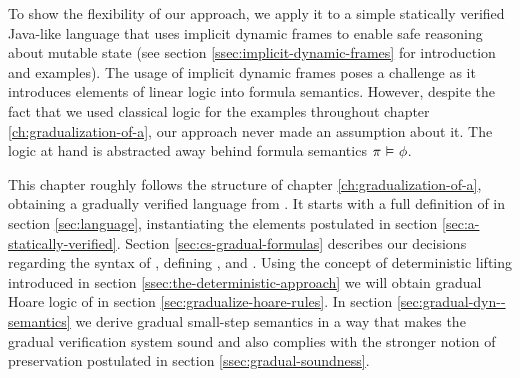 To show the flexibility of our approach, we apply it to a simple statically verified Java-like language \svlidf that uses implicit dynamic frames to enable safe reasoning about mutable state (see section \ref{ssec:implicit-dynamic-frames} for introduction and examples).
The usage of implicit dynamic frames poses a challenge as it introduces elements of linear logic into formula semantics.
However, despite the fact that we used classical logic for the examples throughout chapter \ref{ch:gradualization-of-a}, our approach never made an assumption about it.
The logic at hand is abstracted away behind formula semantics $\pi \,\,{\vDash}\,\, \phi$.

This chapter roughly follows the structure of chapter \ref{ch:gradualization-of-a}, obtaining a gradually verified language \gvlidf from \svlidf.
It starts with a full definition of \svlidf in section \ref{sec:language}, instantiating the elements postulated in section \ref{sec:a-statically-verified}.
Section \ref{sec:cs-gradual-formulas} describes our decisions regarding the syntax of \gvlidf, defining \setGFormula, \setGStmt and \setGProgramState.
Using the concept of deterministic lifting introduced in section \ref{ssec:the-deterministic-approach} we will obtain gradual Hoare logic of \gvlidf in section \ref{sec:gradualize-hoare-rules}.
In section \ref{sec:gradual-dyn--semantics} we derive gradual small-step semantics in a way that makes the gradual verification system sound and also complies with the stronger notion of preservation postulated in section \ref{ssec:gradual-soundness}.